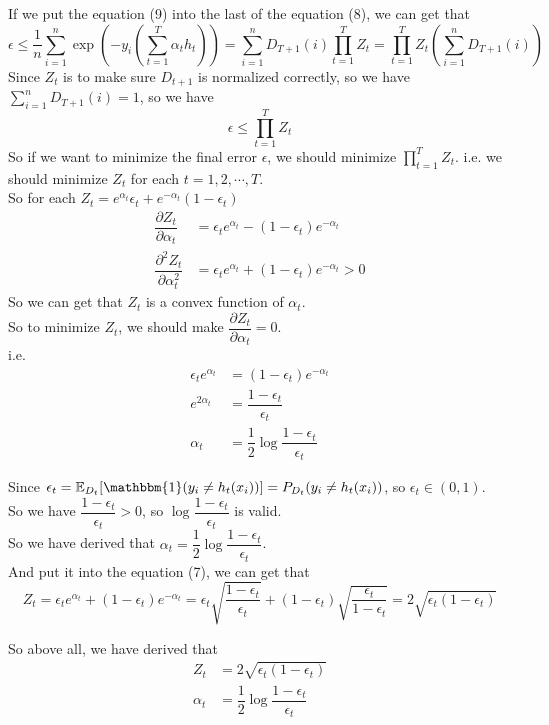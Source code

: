 \documentclass[10pt]{article}
\begin{document}
\begin{enumerate}[1.]
If we put the equation (9) into the last of the equation (8), we can get that
$$\epsilon \leq \frac{1}{n} \sum_{i=1}^n \exp \left(-y_i (\sum\limits_{t=1}^{T}\alpha_th_t)\right) =\sum_{i=1}^n D_{T+1}(i)\prod_{t=1}^{T}Z_t=\prod_{t=1}^{T}Z_t\left(\sum_{i=1}^n D_{T+1}(i)\right)$$
Since $Z_t$ is to make sure $D_{t+1}$ is normalized correctly, so we have $\sum\limits_{i=1}^n D_{T+1}(i)=1$, so we have
$$\epsilon \leq \prod_{t=1}^{T}Z_t$$
So if we want to minimize the final error $\epsilon$, we should minimize $\prod\limits_{t=1}^{T}Z_t$.
i.e. we should minimize $Z_t$ for each $t=1,2,\cdots,T$.\\
So for each $Z_t=e^{\alpha_t}\epsilon_t+e^{-\alpha_t}(1-\epsilon_t)$
\begin{align*}
    \dfrac{\partial Z_t}{\partial\alpha_t}&=\epsilon_te^{\alpha_t}-(1-\epsilon_t)e^{-\alpha_t}\\
    \dfrac{\partial^2 Z_t}{\partial\alpha_t^2}&=\epsilon_te^{\alpha_t}+(1-\epsilon_t)e^{-\alpha_t}>0
\end{align*}
So we can get that $Z_t$ is a convex function of $\alpha_t$.\\
So to minimize $Z_t$, we should make $\dfrac{\partial Z_t}{\partial\alpha_t}=0$.\\
i.e. 
\begin{align*}
    \epsilon_te^{\alpha_t}&=(1-\epsilon_t)e^{-\alpha_t}\\
    e^{2\alpha_t}&=\dfrac{1-\epsilon_t}{\epsilon_t}\\
    \alpha_t&=\dfrac{1}{2}\log\dfrac{1-\epsilon_t}{\epsilon_t}
\end{align*}

Since $\epsilon_t=\mathbb{E}_{D_t}[\mathbbm{1}(y_{i} \neq h_{t}(x_{i}))]=P_{D_t}(y_{i} \neq h_{t}(x_{i}))$, so $\epsilon_t\in(0,1)$.\\
So we have $\dfrac{1-\epsilon_t}{\epsilon_t}>0$, so $\log\dfrac{1-\epsilon_t}{\epsilon_t}$ is valid.\\

So we have derived that $\alpha_t=\dfrac{1}{2}\log\dfrac{1-\epsilon_t}{\epsilon_t}$.\\
And put it into the equation (7), we can get that
$$Z_t=\epsilon_te^{\alpha_t}+(1-\epsilon_t)e^{-\alpha_t}=\epsilon_t\sqrt{\dfrac{1-\epsilon_t}{\epsilon_t}}+(1-\epsilon_t)\sqrt{\dfrac{\epsilon_t}{1-\epsilon_t}}=2\sqrt{\epsilon_t(1-\epsilon_t)}$$

So above all, we have derived that
\begin{align*}
    Z_t&=2\sqrt{\epsilon_t(1-\epsilon_t)}\\
    \alpha_t&=\dfrac{1}{2}\log\dfrac{1-\epsilon_t}{\epsilon_t}
\end{align*}


\end{enumerate}
\end{document}
